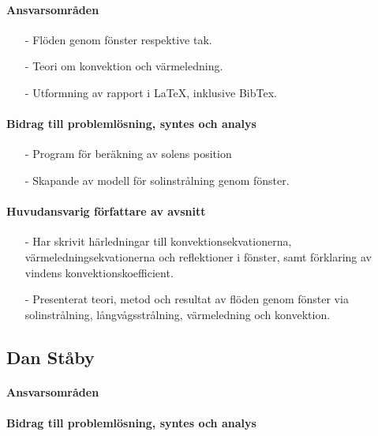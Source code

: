 \documentclass[12pt,a4paper]{article}
\begin{document}
\paragraph{Ansvarsområden}

\begin{itemize}
\item[-] Flöden genom fönster respektive tak.
\item[-] Teori om konvektion och värmeledning.
\item[-] Utformning av rapport i \LaTeX, inklusive BibTex.
\end{itemize}

\paragraph{Bidrag till problemlösning, syntes och analys}

\begin{itemize}
\item[-] Program för beräkning av solens position
\item[-] Skapande av modell för solinstrålning genom fönster.
\end{itemize}

\paragraph{Huvudansvarig författare av avsnitt}

\begin{itemize}
<<<<<<< HEAD
\item[-] Har skrivit härledningar till konvektionsekvationerna, värmeledningsekvationerna och reflektioner i fönster, samt förklaring av vindens konvektionskoefficient.
\item[-] Presenterat teori, metod och resultat av flöden genom fönster via solinstrålning, långvågsstrålning, värmeledning och konvektion.
\end{itemize}



\subsection*{Dan Ståby}

\paragraph{Ansvarsområden}

\paragraph{Bidrag till problemlösning, syntes och analys}
\end{document}
